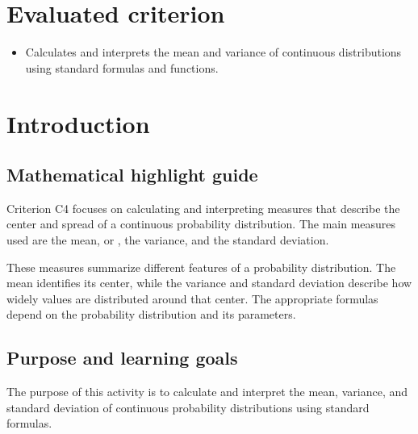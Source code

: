 	\section*{Evaluated criterion}
	\begin{itemize}
		\item [\textbf{C5.}] Calculates and interprets the mean and variance of continuous distributions using standard formulas and functions.
	\end{itemize}
	
	\vspace{-4mm}
	
	\section{Introduction}\label{sec:c4-introduction}
\subsection*{Mathematical highlight guide}
\label{tone:C5:legend}

	\vspace{8mm}
	
	Criterion C4 focuses on calculating and interpreting measures that describe the
	center and spread of a continuous probability distribution.  The main measures
	used are the mean, or  , the variance, and the standard deviation.
	
	These measures summarize different features of a probability distribution.  The
	mean identifies its center, while the variance and standard deviation describe
	how widely values are distributed around that center.  The appropriate formulas
	depend on the probability distribution and its parameters.
	
\subsection{Purpose and learning goals}\label{sec:c4-intro-purpose}
The purpose of this activity is to calculate and interpret the mean, variance,
and standard deviation of continuous probability distributions using standard
formulas.

